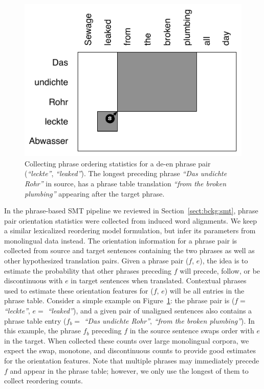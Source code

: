\documentclass[11pt]{article}
\newcommand{\mnote}[1]{\marginpar{%
  \vskip-\baselineskip
  \raggedright\footnotesize
  \itshape\hrule\smallskip\tiny{#1}\par\smallskip\hrule}}
\newcommand{\mtodo}[1]{\mnote{\textcolor{red}{#1}}}
\newcommand{\secref}[1]{Section~\ref{#1}}
\newcommand{\figref}[1]{Figure~\ref{#1}}
\newcommand{\emq}[1]{\emph{``#1''}}
\begin{document}
\begin{figure}[t]
\begin{center}
\includegraphics[width=0.8 \linewidth]{../figures/monoreord/monoreord.pdf}
\caption{Collecting phrase ordering statistics for a de-en phrase pair (\emq{leckte}, \emq{leaked}).  The longest preceding phrase \emq{Das undichte Rohr} in source, has a phrase table translation \emq{from the broken plumbing} appearing after the target phrase.}
\label{fig:monoreord}
\end{center}
\vskip -0.2in
\end{figure}

In the phrase-based SMT pipeline we reviewed in \secref{sect:bckg:smt}, phrase pair orientation statistics were collected from induced word alignments.  We keep a similar lexicalized reordering model formulation, but infer its parameters from monolingual data instead.  The orientation information for a phrase pair is collected from source and target sentences containing the two phrases as well as other hypothesized translation pairs.  Given a phrase pair ($f$, $e$), the idea is to estimate the probability that other phrases preceding $f$ will precede, follow, or be discontinuous with $e$ in target sentences when translated.  Contextual phrases used to estimate these orientation features for ($f$, $e$) will be all entries in the phrase table.  Consider a simple example on \figref{fig:monoreord}: the phrase pair is ($f =$ \emq{leckte}, $e =$ \emq{leaked}), and a given pair of unaligned sentences also contains a phrase table entry ($f_{b} =$ \emq{Das undichte Rohr}, \emq{from the broken plumbing}).  In this example, the phrase $f_{b}$ preceding $f$ in the source sentence swaps order with $e$ in the target.  When collected these counts over large monolingual corpora, we expect the swap, monotone, and discontinuous counts to provide good estimates for the orientation features.  Note that multiple phrases may immediately precede $f$ and appear in the phrase table; however, we only use the longest of them to collect reordering counts.\mtodo{Explain why?}
\end{document}
